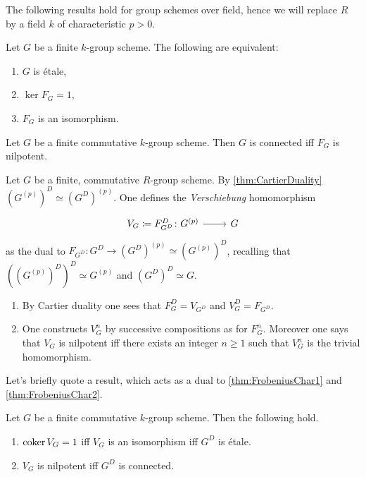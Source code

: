 \documentclass[../Main]{subfiles}
\begin{document}
The following results hold for group schemes over field, hence we will replace
$R$ by a field $k$ of characteristic $p > 0$.
\begin{prop}[]\label{thm:FrobeniusChar1}
	Let $G$ be a finite $k$-group scheme.
	The following are equivalent:
\begin{enumerate}
	\item $G$ is étale,
	\item $\ker F_G = 1$,
	\item $F_G$ is an isomorphism.
\end{enumerate}
\end{prop}


\begin{prop}[]\label{thm:FrobeniusChar2}
	Let $G$ be a finite commutative $k$-group scheme.
	Then $G$ is connected iff $F_G$ is nilpotent.
\end{prop}


\begin{defn}[Verschiebung]
	Let $G$ be a finite, commutative $R$-group scheme.
	By \cref{thm:CartierDuality} $(G^{(p)})^D \simeq (G^D)^{(p)}$.
	One defines the {\em Verschiebung} homomorphism
	\begin{equation}
	\begin{tikzcd}[row sep = 0ex
		,/tikz/column 1/.append style={anchor=base east}
		,/tikz/column 2/.append style={anchor=base west}]
		V_G \coloneqq F^D_{G^D}\colon G^{(p)} \arrow[r, "", rightarrow] &
		G
	\end{tikzcd}
	\end{equation} 
	as the dual to $F_{G^D}\colon G^D \to (G^D)^{(p)} \simeq (G^{(p)})^D$,
	recalling that $((G^{(p)})^D)^D \simeq G^{(p)}$ and $(G^D)^D \simeq G$.
\end{defn}

\begin{rem}[]\leavevmode\vspace{-.2\baselineskip}
\begin{enumerate}
\item By Cartier duality one sees that $F^D_G = V_{G^D}$ and
	$V^D_G = F_{G^D}$.
\item One constructs $V^n_G$ by successive compositions as for $F^n_G$.
	Moreover one says that $V_G$ is nilpotent iff there exists an integer $n \geq 1$
	such that $V^n_G$ is the trivial homomorphism.
\end{enumerate}
\end{rem}


Let's briefly quote a result, which acts as a dual to
\cref{thm:FrobeniusChar1} and \cref{thm:FrobeniusChar2}.
\begin{prop}[]
	Let $G$ be a finite commutative $k$-group scheme. Then the following hold.
\begin{enumerate}
	\item $\operatorname{coker} V_G = 1$ iff $V_G$ is an isomorphism iff
		$G^D$ is étale.
	\item $V_G$ is nilpotent iff $G^D$ is connected.
\end{enumerate}
\end{prop}
\end{document}
